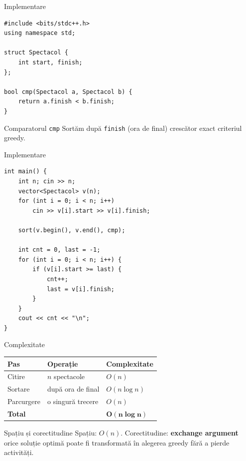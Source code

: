 \documentclass{beamer}
\begin{document}
\begin{frame}[fragile]{Implementare}
\begin{lstlisting}
#include <bits/stdc++.h>
using namespace std;

struct Spectacol {
    int start, finish;
};

bool cmp(Spectacol a, Spectacol b) {
    return a.finish < b.finish;
}
\end{lstlisting}
  \begin{block}{Comparatorul \texttt{cmp}}
    Sortăm după \texttt{finish} (ora de final) crescător \textemdash{}
    exact criteriul greedy.
  \end{block}
\end{frame}

\begin{frame}[fragile]{Implementare}
\begin{lstlisting}
int main() {
    int n; cin >> n;
    vector<Spectacol> v(n);
    for (int i = 0; i < n; i++)
        cin >> v[i].start >> v[i].finish;

    sort(v.begin(), v.end(), cmp);

    int cnt = 0, last = -1;
    for (int i = 0; i < n; i++) {
        if (v[i].start >= last) {
            cnt++;
            last = v[i].finish;
        }
    }
    cout << cnt << "\n";
}
\end{lstlisting}
\end{frame}

\begin{frame}{Complexitate}
  \begin{center}
  \begin{tabular}{lll}
    \toprule
    Pas & Operație & Complexitate \\
    \midrule
    Citire     & $n$ spectacole    & $O(n)$ \\
    Sortare    & după ora de final & $O(n \log n)$ \\
    Parcurgere & o singură trecere & $O(n)$ \\
    \midrule
    \textbf{Total} & & $\mathbf{O(n \log n)}$ \\
    \bottomrule
  \end{tabular}
  \end{center}
  \smallskip
  \begin{block}{Spațiu și corectitudine}
    Spațiu: $O(n)$. Corectitudine: \textbf{exchange argument} \textemdash{}
    orice soluție optimă poate fi transformată în alegerea greedy
    fără a pierde activități.
  \end{block}
\end{frame}
\end{document}
